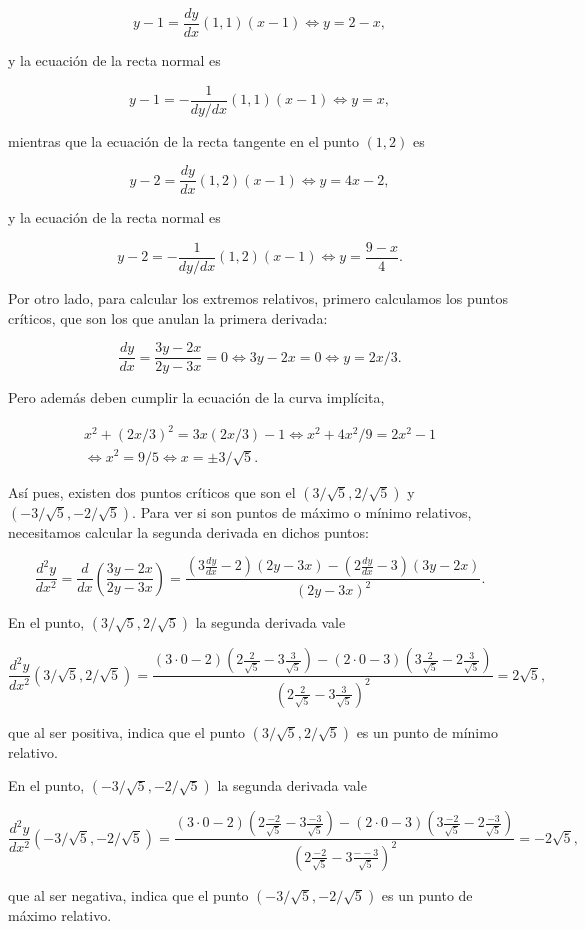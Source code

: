 \documentclass[
  a4paper,
]{scrreport}
\theoremstyle{definition}
\theoremstyle{remark}
\begin{document}
\begin{tcolorbox}
\[
y-1 = \frac{dy}{dx}(1,1)(x-1) \Leftrightarrow y= 2-x,
\]

y la ecuación de la recta normal es

\[
y-1 = -\frac{1}{dy/dx}(1,1)(x-1) \Leftrightarrow y= x,
\]

mientras que la ecuación de la recta tangente en el punto \((1,2)\) es

\[
y-2 = \frac{dy}{dx}(1,2)(x-1) \Leftrightarrow y= 4x-2,
\]

y la ecuación de la recta normal es

\[
y-2 = -\frac{1}{dy/dx}(1,2)(x-1) \Leftrightarrow y=\frac{9-x}{4}.
\]

Por otro lado, para calcular los extremos relativos, primero calculamos
los puntos críticos, que son los que anulan la primera derivada:

\[
\frac{dy}{dx}=\frac{3y-2x}{2y-3x}=0 \Leftrightarrow 3y-2x=0 \Leftrightarrow y=2x/3.
\]

Pero además deben cumplir la ecuación de la curva implícita,

\[
\begin{gathered}
x^{2}+(2x/3)^{2}=3x(2x/3)-1 \Leftrightarrow x^{2}+4x^{2}/9 = 2x^{2}-1\\  \Leftrightarrow x^{2}=9/5 \Leftrightarrow x=\pm 3/\sqrt{5}.
\end{gathered}
\]

Así pues, existen dos puntos críticos que son el
\((3/\sqrt{5},2/\sqrt{5})\) y \((-3/\sqrt{5},-2/\sqrt{5})\). Para ver si
son puntos de máximo o mínimo relativos, necesitamos calcular la segunda
derivada en dichos puntos:

\[
\frac{d^{2}y}{dx^{2}}= \frac{d}{dx}\left(\frac{3y-2x}{2y-3x}\right) = \frac{(3\frac{dy}{dx}-2)(2y-3x)-(2\frac{dy}{dx}-3)(3y-2x)}{(2y-3x)^{2}}.
\]

En el punto, \((3/\sqrt{5},2/\sqrt{5})\) la segunda derivada vale

\[
\frac{d^{2}y}{dx^{2}}(3/\sqrt{5},2/\sqrt{5})=
\frac{(3\cdot 0-2)(2\frac{2}{\sqrt{5}}-3\frac{3}{\sqrt{5}})-(2\cdot 0-3)(3\frac{2}{\sqrt{5}}-2\frac{3}{\sqrt{5}})}{(2\frac{2}{\sqrt{5}}-3\frac{3}{\sqrt{5}})^{2}} = 2\sqrt{5},
\]

que al ser positiva, indica que el punto \((3/\sqrt{5},2/\sqrt{5})\) es
un punto de mínimo relativo.

En el punto, \((-3/\sqrt{5},-2/\sqrt{5})\) la segunda derivada vale

\[
\frac{d^{2}y}{dx^{2}}(-3/\sqrt{5},-2/\sqrt{5})=
\frac{(3\cdot 0-2)(2\frac{-2}{\sqrt{5}}-3\frac{-3}{\sqrt{5}})-(2\cdot 0-3)(3\frac{-2}{\sqrt{5}}-2\frac{-3}{\sqrt{5}})}{(2\frac{-2}{\sqrt{5}}-3\frac{--3}{\sqrt{5}})^{2}} = -2\sqrt{5},
\]

que al ser negativa, indica que el punto \((-3/\sqrt{5},-2/\sqrt{5})\)
es un punto de máximo relativo.

\end{tcolorbox}
\end{document}
